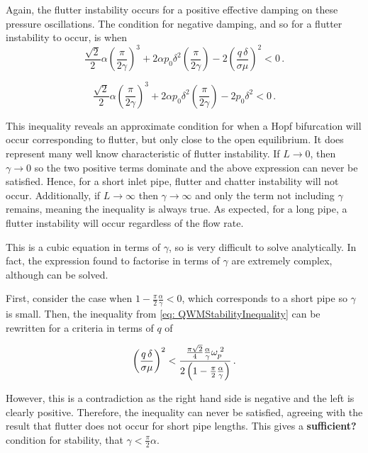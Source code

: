 Again, the flutter instability occurs for a positive effective damping on these pressure oscillations. The condition for negative damping, and so for a flutter instability to occur, is when
~
\begin{equation} \label{eq: QWMStabilityInequality}
    \frac{\sqrt{2}}{2} \alpha \left( \frac{\pi}{2 \gamma} \right)^3 + 2 \alpha p_0 \delta^2 \left( \frac{\pi}{2 \gamma} \right) - 2 \left( \frac{q \, \delta}{\sigma \mu} \right)^2 < 0 \, .
\end{equation}

\begin{equation*} %
    \frac{\sqrt{2}}{2} \alpha \left( \frac{\pi}{2 \gamma} \right)^3 + 2 \alpha p_0 \delta^2 \left( \frac{\pi}{2 \gamma} \right) - 2 p_0 \delta^2 < 0 \, .
\end{equation*}

This inequality reveals an approximate condition for when a Hopf bifurcation will occur corresponding to flutter, but only close to the open equilibrium. It does represent many well know characteristic of flutter instability. If $L \rightarrow 0$, then $\gamma \rightarrow 0$ so the two positive terms dominate and the above expression can never be satisfied. Hence, for a short inlet pipe, flutter and chatter instability will not occur. Additionally, if $L \rightarrow \infty$ then $\gamma \rightarrow \infty$ and only the term not including $\gamma$ remains, meaning the inequality is always true. As expected, for a long pipe, a flutter instability will occur regardless of the flow rate.

This is a cubic equation in terms of $\gamma$, so is very difficult to solve analytically. In fact, the expression found to factorise in terms of $\gamma$ are extremely complex, although can be solved.

First, consider the case when $1 - \frac{\pi}{2} \frac{\alpha}{\gamma} < 0$, which corresponds to a short pipe so $\gamma$ is small. Then, the inequality from \cref{eq: QWMStabilityInequality} can be rewritten for a criteria in terms of $q$ of

\begin{equation*}
    \left( \frac{q \, \delta}{\sigma \mu} \right)^2 < \frac{\frac{\pi \sqrt{2}}{4} \frac{\alpha}{\gamma} \omega_p^{\;2}}{2 \left( 1 - \frac{\pi}{2}\frac{\alpha}{\gamma} \right)} \, .
\end{equation*}

However, this is a contradiction as the right hand side is negative and the left is clearly positive. Therefore, the inequality can never be satisfied, agreeing with the result that flutter does not occur for short pipe lengths. This gives a \textbf{sufficient?} condition for stability, that $\gamma < \frac{\pi}{2} \alpha$.

